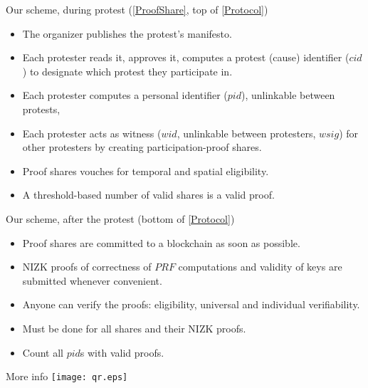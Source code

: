 \begin{columns}[t]
\begin{column}{0.32\linewidth}
    \begin{blackblock}{Our scheme, during protest (\cref{ProofShare}, top of 
        \cref{Protocol})}
      \begin{itemize}
        \item The organizer publishes the protest's manifesto.
        \item Each protester reads it, approves it, computes a protest (cause) 
          identifier (\(cid\)) to designate which protest they participate in.
        \item Each protester computes a personal identifier (\(pid\)), 
          unlinkable between protests,
        \item Each protester acts as witness (\(wid\), unlinkable between 
          protesters, \(wsig\)) for other protesters by creating 
          participation-proof shares.
        \item Proof shares vouches for temporal and spatial eligibility.
        \item A threshold-based number of valid shares is a valid proof.
      \end{itemize}
    \end{blackblock}

    \begin{blackblock}{Our scheme, after the protest (bottom of 
        \cref{Protocol})}
      \begin{itemize}
        \item Proof shares are committed to a blockchain as soon as possible.
        \item \Ac{NIZK} proofs of correctness of \(PRF\) computations and 
          validity of keys are submitted whenever convenient.
        \item Anyone can verify the proofs: eligibility, universal and 
          individual verifiability.
        \item Must be done for all shares and their \ac{NIZK} proofs.
        \item Count all \(pid\)s with valid proofs.
      \end{itemize}
    \end{blackblock}

    \begin{block}{More info}
      \centering
      \texttt{[image: qr.eps]}
    \end{block}

    \printbibliography[heading=none]

  \end{column}


\end{columns}
